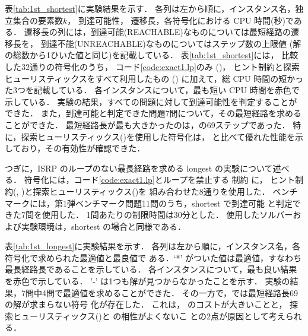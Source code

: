 表\ref{tab:1st_shortest}に実験結果を示す．
各列は左から順に，インスタンス名，独立集合の要素数$k$，
到達可能性，
遷移長，各符号化における CPU 時間(秒)である．
遷移長の列には，到達可能(REACHABLE)なものについては最短経路の遷移長を，
到達不能(UNREACHABLE)なものについてはステップ数の上限値
(解の総数から1ひいた値と同じ)を記載している．
表\ref{tab:1st_shortest}には，
比較した32通りの符号化のうち，
コード\ref{code:exact1.lp}のみ ()，
ヒント制約と探索ヒューリスティックスをすべて利用したもの ()
に加えて，総 CPU 時間の短かった3つを記載している．
各インスタンスについて，最も短い CPU 時間を赤色で示している．
%
実験の結果，すべての問題に対して到達可能性を判定することができた．
また，到達可能と判定できた問題7問について，その最短経路を求めることができた．
最短経路長が最も大きかったのは，の69ステップであった．
特に，探索ヒューリスティックス()を使用した符号化は，
 と比べて優れた性能を示しており，その有効性が確認できた．

つぎに，ISRP のループのない最長経路を求める longest の実験について述べる．
符号化には，コード\ref{code:exact1.lp}とループを禁止する
制約  に，
ヒント制約(, )と探索ヒューリスティックス()を
組み合わせた8通りを使用した．
ベンチマークには，第1弾ベンチマーク問題11問のうち，shortest で到達可能
と判定できた7問を使用した．
1問あたりの制限時間は30分とした．
使用したソルバーおよび実験環境は，shortest の場合と同様である．

表\ref{tab:1st_longest}に実験結果を示す．
各列は左から順に，インスタンス名，各符号化で求められた最適値と最良値で
ある．`*' がついた値は最適値，すなわち最長経路長であることを示している．
各インスタンスについて，最も良い結果を赤色で示している．
'-' は1つも解が見つからなかったことを示す．
%
実験の結果，7問中4問で最適値を求めることができた．
その一方で，では最短経路長69の解が求まらない符号
化が存在した．
これは， のコストが大きいことと，
探索ヒューリスティックス()と  の相性がよくないこ
との2点が原因として考えられる．

